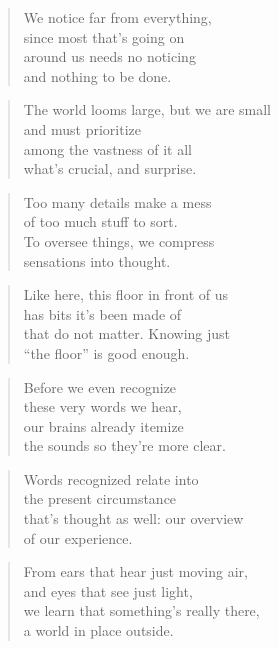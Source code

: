 \documentclass[10pt,a4paper]{article}
\begin{document}
\begin{paracol}{2}
\begin{verse}
We notice far from everything,\\
since most that’s going on\\
around us needs no noticing\\
and nothing to be done.
\end{verse}

\begin{verse}
The world looms large, but we are small\\
and must prioritize\\
among the vastness of it all\\
what’s crucial, and surprise.
\end{verse}

\begin{verse}
Too many details make a mess\\
of too much stuff to sort.\\
To oversee things, we compress\\
sensations into thought.
\end{verse}

\begin{verse}
Like here, this floor in front of us\\
has bits it’s been made of\\
that do not matter. Knowing just\\
“the floor” is good enough.
\end{verse}

\begin{verse}
Before we even recognize\\
these very words we hear,\\
our brains already itemize\\
the sounds so they’re more clear.
\end{verse}

\begin{verse}
Words recognized relate into\\
the present circumstance\\
that’s thought as well: our overview\\
of our experience.
\end{verse}

\begin{verse}
From ears that hear just moving air,\\
and eyes that see just light,\\
we learn that something’s really there,\\
a world in place outside.
\end{verse}


\end{paracol}
\end{document}

